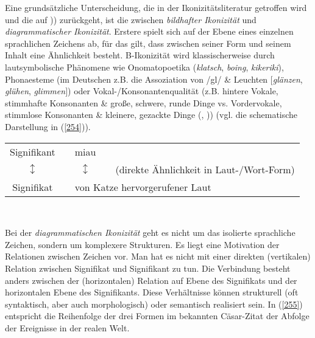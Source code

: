 Eine grundsätzliche Unterscheidung, die in der Ikonizitätsliteratur getroffen wird und die auf \citet[2.277]{Peirce1960})) zurückgeht, ist die zwischen \textit{bildhafter Ikonizität}  und  \textit{diagrammatischer Ikonizität}. Erstere spielt sich auf der Ebene eines einzelnen sprachlichen Zeichens ab, für das gilt, dass zwischen seiner Form und seinem Inhalt eine Ähnlichkeit besteht. B-Ikonizität wird klassischerweise durch lautsymbolische Phänomene  wie Onomatopoetika  (\textit{klatsch}, \textit{boing}, \textit{kikeriki}), Pho\-naesteme  (im Deutschen z.B. die Assoziation von /gl/ \& Leuchten $[$\textit{glänzen}, \textit{glühen}, \textit{glimmen}$]$) oder Vokal-/Konsonantenqualität (z.B. hintere Vokale, stimmhafte Konsonanten \& große, schwere, runde Dinge vs. Vordervokale, stimmlose Konsonanten \& kleinere, gezackte Dinge (\citealt{Koehler1929}, \citealt{Ramachandran2001})) (vgl. die schematische   Darstellung in (\ref{254})).

\begin{exe}
\ex\label{254}
\begin{tabular}[t]{ccccc}
  	Signifikant & & miau & &\\
 	$\updownarrow$ & & $\updownarrow$ & & \scriptsize(direkte Ähnlichkeit in Laut-/Wort-Form)\\
 	Signifikat & & \multicolumn{3}{l}{\glq von Katze hervorgerufener Laut\grq {}}\\
\end{tabular}\\
\hbox{}\hfill\hbox{\citet[xxii]{Fischer1999}}
\end{exe}
Bei der \textit{diagrammatischen Ikonizität} geht es nicht um das isolierte sprachliche Zeichen, sondern um komplexere Strukturen. Es liegt eine Motivation der Relationen zwischen Zeichen vor. Man hat es nicht mit einer direkten (vertikalen) Relation zwischen Signifikat und Signifikant zu tun. Die Verbindung besteht anders zwischen der (horizontalen) Relation auf Ebene des Signifikats und der horizontalen Ebene des Signifikants. Diese Verhältnisse können strukturell (oft syntaktisch, aber auch morphologisch) oder semantisch realisiert sein. In (\ref{255}) entspricht die Reihenfolge der drei Formen im bekannten Cäsar-Zitat der Abfolge der Ereignisse in der realen Welt.

